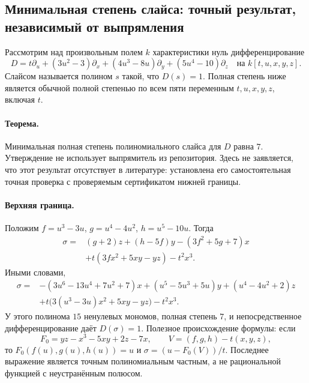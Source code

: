 \subsection{Минимальная степень слайса: точный результат, независимый от выпрямления}

Рассмотрим над произвольным полем $k$ характеристики нуль дифференцирование
\[
 D=t\partial_u+(3u^2-3)\partial_x+(4u^3-8u)\partial_y
 +(5u^4-10)\partial_z
 \quad\text{на }k[t,u,x,y,z].
\]
Слайсом называется полином $s$ такой, что $D(s)=1$.
Полная степень ниже является обычной полной степенью по всем пяти переменным
$t,u,x,y,z$, включая $t$.

\paragraph{Теорема.}
Минимальная полная степень полиномиального слайса для $D$ равна $7$.
Утверждение не использует выпрямитель из репозитория. Здесь не заявляется,
что этот результат отсутствует в литературе: установлена его самостоятельная
точная проверка с проверяемым сертификатом нижней границы.

\paragraph{Верхняя граница.}
Положим $f=u^3-3u$, $g=u^4-4u^2$, $h=u^5-10u$. Тогда
\begin{align*}
 \sigma={}&(g+2)z+(h-5f)y-(3f^2+5g+7)x\\
 &+t(3fx^2+5xy-yz)-t^2x^3.
\end{align*}
Иными словами,
\begin{align*}
 \sigma={}&-(3u^6-13u^4+7u^2+7)x
 +(u^5-5u^3+5u)y+(u^4-4u^2+2)z\\
 &+t\bigl(3(u^3-3u)x^2+5xy-yz\bigr)-t^2x^3.
\end{align*}
У этого полинома $15$ ненулевых мономов, полная степень $7$,
и непосредственное дифференцирование даёт $D(\sigma)=1$.
Полезное происхождение формулы: если
\[
 F_0=yz-x^3-5xy+2z-7x,\qquad
 V=(f,g,h)-t(x,y,z),
\]
то $F_0(f(u),g(u),h(u))=u$ и $\sigma=(u-F_0(V))/t$.
Последнее выражение является точным полиномиальным частным, а не
рациональной функцией с неустранённым полюсом.

